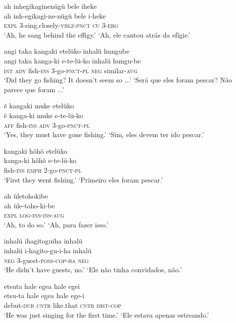 \documentclass[output=paper,
modfonts,nonflat
]{langsci/langscibook}
\begin{document}
\ea  ah inhegikaginenügü bele iheke\\[.3em]
\gll ah inh-egikagi-ne-nügü bele i-heke\\
     \textsc{expl} 3-sing.closely-\textsc{vblz}-\textsc{pnct} \textsc{cu} 3-\textsc{erg}\\
\glt ‘Ah, he sang behind the effigy.’
\glt ‘Ah, ele cantou atrás da efígie.’
\z

\ea  angi taka kangaki etelüko inhalü hungube\\[.3em]
\gll angi taka kanga-ki e-te-lü-ko inhalü hungu-be\\
     \textsc{int} \textsc{adv} fish-\textsc{ins} 3-go-\textsc{pnct}-\textsc{pl} \textsc{neg} similar-\textsc{aug}\\
\glt ‘Did they go fishing? It doesn't seem so ...’
\glt ‘Será que eles foram pescar? Não parece que foram ...’
\z

\ea  ẽ kangaki muke etelüko\\[.3em]
\gll ẽ kanga-ki muke e-te-lü-ko\\
     \textsc{aff} fish-\textsc{ins} \textsc{adv} 3-go-\textsc{pnct}-\textsc{pl}\\
\glt ‘Yes, they must have gone fishing.’
\glt ‘Sim, eles devem ter ido pescar.’
\z

\ea  kangaki hõhõ etelüko\\[.3em]
\gll kanga-ki hõhõ e-te-lü-ko\\
     fish-\textsc{ins} \textsc{emph} 2-go-\textsc{pnct}-\textsc{pl}\\
\glt ‘First they went fishing.’
\glt ‘Primeiro eles foram pescar.’
\z

\ea  ah ületohokibe\\[.3em]
\gll ah üle-toho-ki-be\\
     \textsc{expl} \textsc{log}-\textsc{ins}-\textsc{ins}-\textsc{aug}\\
\glt ‘Ah, to do so.’
\glt ‘Ah, para fazer isso.’
\z

\ea  inhalü ihagitoguiha inhalü\\[.3em]
\gll inhalü i-hagito-gu-i-ha inhalü\\
     \textsc{neg} 3-guest-\textsc{poss}-\textsc{cop}-\textsc{ha} \textsc{neg}\\
\glt ‘He didn't have guests, no.’
\glt ‘Ele não tinha convidados, não.’
\z

\ea  etsuta hale egea hale egei\\[.3em]
\gll etsu-ta hale egea hale ege-i\\
     debut-\textsc{dur} \textsc{cntr} like.that \textsc{cntr} \textsc{dist}-\textsc{cop}\\
\glt ‘He was just singing for the first time.’
\glt ‘Ele estava apenas estreando.’
\z
\end{document}
